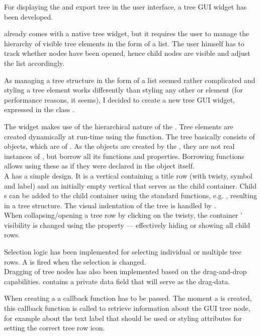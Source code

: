 For displaying the  and export tree in the user interface, a tree GUI widget has been developed.

 already comes with a native tree widget, but it requires the user to manage the hierarchy of visible tree elements in the form of a list. The user himself has to track whether nodes have been opened, hence child nodes are visible and adjust the list accordingly.

As managing a tree structure in the form of a list seemed rather complicated and styling a  tree element works differently than styling any other  or  element (for performance reasons, it seems), I decided to create a new tree GUI widget, expressed in the class .

The widget makes use of the hierarchical nature of the  . Tree elements are created dynamically at run-time using the \linebreak{} function. The tree basically consists of   objects, which are  of . As the  objects are created by the , they are not real instances of , but borrow all its functions and properties. Borrowing functions allows using these as if they were declared in the object itself.\\
A  has a simple design. It is a vertical  containing a title row (with twisty, symbol and label) and an initially empty vertical  that serves as the child container. Child s can be added to the child container using the standard  functions, e.g. , resulting in a tree structure. The visual indentation of the tree is handled by .\\
When collapsing/opening a tree row by clicking on the twisty, the container ' visibility is changed using the   property --- effectively hiding or showing all child rows.

Selection logic has been implemented for selecting individual or multiple tree rows. A   is fired when the selection is changed.\\
Dragging of tree nodes has also been implemented based on the  drag-and-drop capabilities.  contains a private data field that will serve as the drag-data.

When creating a  a callback function has to be passed. The moment a  is created, this callback function is called to retrieve information about the GUI tree node, for example about the text label that should be used or styling attributes for setting the correct tree row icon.


